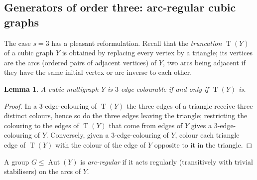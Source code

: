 \documentclass[11pt,a4paper]{article}
\newtheorem{lemma}[theorem]{Lemma}
\theoremstyle{definition}
\theoremstyle{remark}
\newcommand{\Aut}{\operatorname{Aut}}
\newcommand{\Tr}{\operatorname{T}}
\begin{document}
\subsection{Generators of order three: arc-regular cubic graphs}\label{sec:arcregular}
The case $s=3$ has a pleasant reformulation.  Recall that the \emph{truncation} $\Tr(Y)$ of a cubic graph $Y$ is obtained by replacing every vertex by a triangle; its vertices are the arcs (ordered pairs of adjacent vertices) of $Y$, two arcs being adjacent if they have the same initial vertex or are inverse to each other.

\begin{lemma}\label{lem:truncation}
A cubic multigraph $Y$ is $3$-edge-colourable if and only if $\Tr(Y)$ is.
\end{lemma}
\begin{proof}
In a $3$-edge-colouring of $\Tr(Y)$ the three edges of a triangle receive three distinct colours, hence so do the three edges leaving the triangle; restricting the colouring to the edges of $\Tr(Y)$ that come from edges of $Y$ gives a $3$-edge-colouring of $Y$.  Conversely, given a $3$-edge-colouring of $Y$, colour each triangle edge of $\Tr(Y)$ with the colour of the edge of $Y$ opposite to it in the triangle.
\end{proof}

A group $G\le\Aut(Y)$ is \emph{arc-regular} if it acts regularly (transitively with trivial stabilisers) on the arcs of $Y$.
\end{document}
